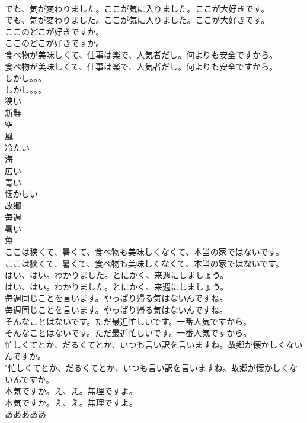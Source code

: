\documentclass[8pt]{extreport}
\begin{document}
\begin{CJK}{UTF8}{min}
\\	でも、気が変わりました。ここが気に入りました。ここが大好きです。	
\\	でも、気が変わりました。ここが気に入りました。ここが大好きです。 
\\	ここのどこが好きですか。	
\\	ここのどこが好きですか。 
\\	食べ物が美味しくて、仕事は楽で、人気者だし。何よりも安全ですから。	
\\	食べ物が美味しくて、仕事は楽で、人気者だし。何よりも安全ですから。 
\\	しかし。。。	
\\	しかし。。。 
\\	狭い
\\	新鮮
\\	空
\\	風
\\	冷たい
\\	海
\\	広い
\\	青い
\\	懐かしい
\\	故郷
\\	毎週
\\	暑い
\\	魚
\\	ここは狭くて、暑くて、食べ物も美味しくなくて、本当の家ではないです。	
\\	ここは狭くて、暑くて、食べ物も美味しくなくて、本当の家ではないです。 
\\	はい、はい。わかりました。とにかく、来週にしましょう。	
\\	はい、はい。わかりました。とにかく、来週にしましょう。 
\\	毎週同じことを言います。やっぱり帰る気はないんですね。	
\\	毎週同じことを言います。やっぱり帰る気はないんですね。 
\\	そんなことはないです。ただ最近忙しいです。一番人気ですから。	
\\	そんなことはないです。ただ最近忙しいです。一番人気ですから。 
\\	忙しくてとか、だるくてとか、いつも言い訳を言いますね。故郷が懐かしくないんですか。	
\\	"忙しくてとか、だるくてとか、いつも言い訳を言いますね。故郷が懐かしくないんですか。 
\\	本気ですか。え、え。無理ですよ。	
\\	本気ですか。え、え。無理ですよ。 
\\	あああああ	

\end{CJK}
\end{document}
